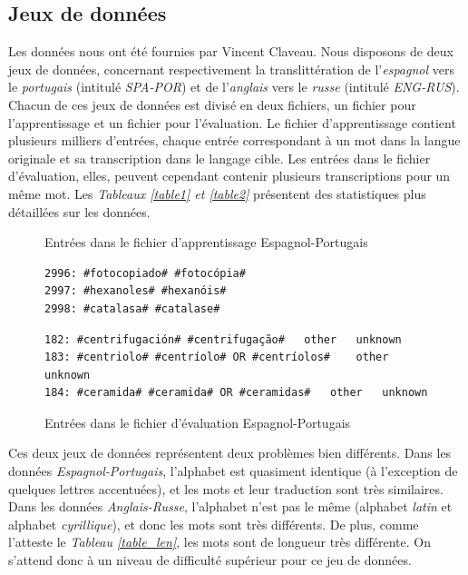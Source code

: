 \documentclass{article}
\begin{document}
\subsection{Jeux de données}
Les données nous ont été fournies par Vincent Claveau. Nous disposons de deux jeux de données, concernant respectivement la translittération de l'\emph{espagnol} vers le \emph{portugais} (intitulé \emph{SPA-POR}) et de l'\emph{anglais} vers le \emph{russe} (intitulé \emph{ENG-RUS}). Chacun de ces jeux de données est divisé en deux fichiers, un fichier pour l'apprentissage et un fichier pour l'évaluation. Le fichier d'apprentissage contient plusieurs milliers d'entrées, chaque entrée correspondant à un mot dans la langue originale et sa transcription dans le langage cible. Les entrées dans le fichier d'évaluation, elles, peuvent cependant contenir plusieurs transcriptions pour un même mot. Les \emph{Tableaux \ref{table1} et \ref{table2}} présentent des statistiques plus détaillées sur les données.

\begin{figure}[H]
\caption{Entrées dans le fichier d'apprentissage Espagnol-Portugais}
\begin{verbatim}
2996: #fotocopiado# #fotocópia#
2997: #hexanoles# #hexanóis#
2998: #catalasa# #catalase#
\end{verbatim}

\caption{Entrées dans le fichier d'évaluation Espagnol-Portugais}
\begin{verbatim}
182: #centrifugación# #centrifugação#	other	unknown
183: #centriolo# #centríolo# OR #centríolos#	other	unknown
184: #ceramida# #ceramida# OR #ceramidas#	other	unknown
\end{verbatim}
\end{figure}

Ces deux jeux de données représentent deux problèmes bien différents. Dans les données \emph{Espagnol-Portugais}, l'alphabet est quasiment identique (à l'exception de quelques lettres accentuées), et les mots et leur traduction sont très similaires.
Dans les données \emph{Anglais-Russe}, l'alphabet n'est pas le même (alphabet \emph{latin} et alphabet \emph{cyrillique}), et donc les mots sont très différents. De plus, comme l'atteste le \emph{Tableau \ref{table_len}}, les mots sont de longueur très différente. On s'attend donc à un niveau de difficulté supérieur pour ce jeu de données.
\end{document}
